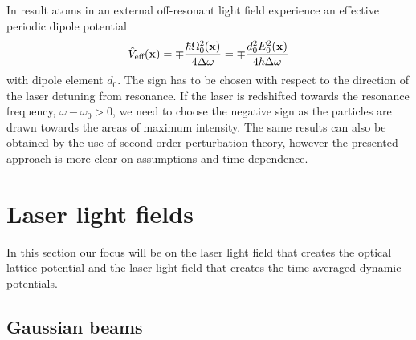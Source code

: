 In result atoms in an external off-resonant light field experience an
effective periodic dipole potential
\begin{equation}
  \hat{V}_\text{eff}(\vb{x})
  =
  \mp\frac{\hbar\Omega_0^2(\vb{x})}{4\Delta\omega}
  =
  \mp\frac{d_0^2E_0^2(\vb{x})}{4\hbar\Delta\omega}
  \label{eq:potential_effective}
\end{equation}
with dipole element $d_0$. The sign has to be chosen with respect to the
direction of the laser detuning from resonance. If the laser is redshifted
towards the resonance frequency, $\omega-\omega_0>0$, we need to choose the
negative sign as the particles are drawn towards the areas of maximum
intensity. The same results can also be obtained by the use of second order
perturbation theory, however the presented approach is more clear on
assumptions and time dependence\cite{Grimm2008}.

\section{Laser light fields}

In this section our focus will be on the laser light field that creates the
optical lattice potential and the laser light field that creates the
time-averaged dynamic potentials.

\subsection{Gaussian beams}

